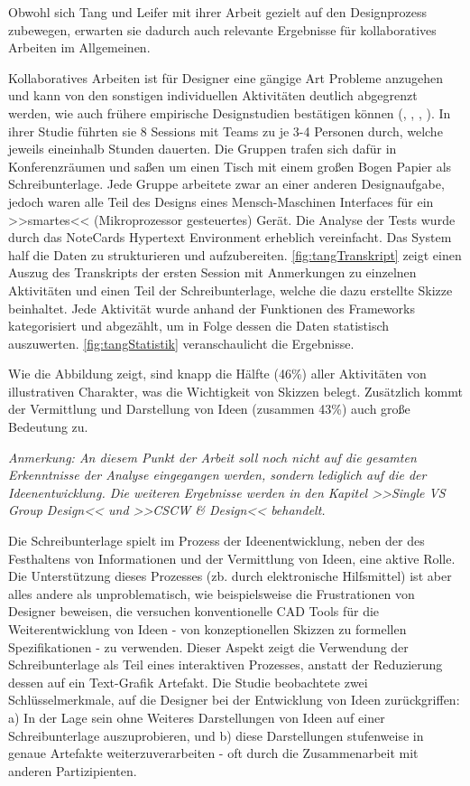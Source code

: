 \medskip Obwohl sich Tang und Leifer mit ihrer Arbeit gezielt auf den Designprozess zubewegen, erwarten sie dadurch auch relevante Ergebnisse für kollaboratives Arbeiten im Allgemeinen. \par Kollaboratives Arbeiten ist für Designer eine gängige Art Probleme anzugehen und kann von den sonstigen individuellen Aktivitäten deutlich abgegrenzt werden, wie auch frühere empirische Designstudien bestätigen können (\citep{Ullman:1987}, \citep{Ballay:1987}, \citep{Akin:1978}, \citep{Lera:1983}).
In ihrer Studie führten sie 8 Sessions mit Teams zu je 3-4 Personen durch, welche jeweils eineinhalb Stunden dauerten. Die Gruppen trafen sich dafür in Konferenzräumen und saßen um einen Tisch mit einem großen Bogen Papier als Schreibunterlage. Jede Gruppe arbeitete zwar an einer anderen Designaufgabe, jedoch waren alle Teil des Designs eines Mensch-Maschinen Interfaces für ein >>smartes<< (Mikroprozessor gesteuertes) Gerät.
Die Analyse der Tests wurde durch das NoteCards Hypertext Environment \citep{Halasz:1986:NN:29933.30859} erheblich vereinfacht. Das System half die Daten zu strukturieren und aufzubereiten. \autoref{fig:tangTranskript} zeigt einen Auszug des Transkripts der ersten Session mit Anmerkungen zu einzelnen Aktivitäten und einen Teil der Schreibunterlage, welche die dazu erstellte Skizze beinhaltet. Jede Aktivität wurde anhand der Funktionen des Frameworks kategorisiert und abgezählt, um in Folge dessen die Daten statistisch auszuwerten. \autoref{fig:tangStatistik} veranschaulicht die Ergebnisse.

\medskip Wie die Abbildung zeigt, sind knapp die Hälfte (46\%) aller Aktivitäten von illustrativen Charakter, was die Wichtigkeit von Skizzen belegt. Zusätzlich kommt der Vermittlung und Darstellung von Ideen (zusammen 43\%) auch große Bedeutung zu.\par
\medskip \emph{Anmerkung: An diesem Punkt der Arbeit soll noch nicht auf die gesamten Erkenntnisse der Analyse eingegangen werden, sondern lediglich auf die der Ideenentwicklung. Die weiteren Ergebnisse werden in den Kapitel >>Single VS Group Design<< und >>CSCW \& Design<< behandelt.}

\medskip Die Schreibunterlage spielt im Prozess der Ideenentwicklung, neben der des Festhaltens von Informationen und der Vermittlung von Ideen, eine aktive Rolle. Die Unterstützung dieses Prozesses (zb. durch elektronische Hilfsmittel) ist aber alles andere als unproblematisch, wie beispielsweise die Frustrationen von Designer beweisen, die versuchen konventionelle CAD Tools für die Weiterentwicklung von Ideen - von konzeptionellen Skizzen zu formellen Spezifikationen - zu verwenden. Dieser Aspekt zeigt die Verwendung der Schreibunterlage als Teil eines interaktiven Prozesses, anstatt der Reduzierung dessen auf ein Text-Grafik Artefakt. 
Die Studie beobachtete zwei Schlüsselmerkmale, auf die Designer bei der Entwicklung von Ideen zurückgriffen: a) In der Lage sein ohne Weiteres Darstellungen von Ideen auf einer Schreibunterlage auszuprobieren, und b) diese Darstellungen stufenweise in genaue Artefakte weiterzuverarbeiten - oft durch die Zusammenarbeit mit anderen Partizipienten. \citep{Tang:1988p279}

